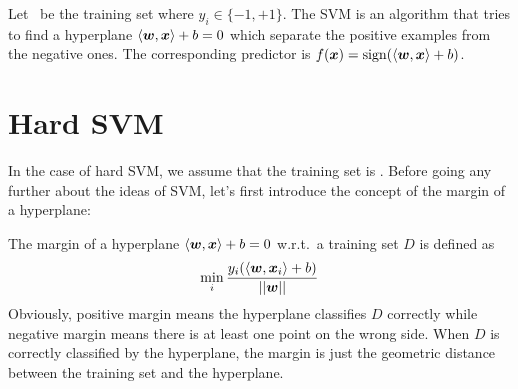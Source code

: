 Let \dataset\ be the training set where $y_i \in\{-1, +1\}$. The SVM is an algorithm that tries to find a 
hyperplane $\langle\boldsymbol{w}, \boldsymbol{x}\rangle + b = 0$ which separate the positive examples from the negative ones. The 
corresponding predictor is $f(\boldsymbol{x}) = \operatorname{sign}(\langle\boldsymbol{w}, \boldsymbol{x}\rangle + b)$.

\section{Hard SVM}
In the case of hard SVM, we assume that the training set is . Before going any 
further about the ideas of SVM, let's first introduce the concept of the margin of a hyperplane:
\begin{df}[Margin]
    The margin of a hyperplane $\langle\boldsymbol{w}, \boldsymbol{x}\rangle + b = 0$ w.r.t.\ a training set  $D$ is defined as
    \begin{equation*}
    \min_i \frac{y_i(\langle\boldsymbol{w}, \boldsymbol{x}_i\rangle + b)}{||\boldsymbol{w}||}
    \end{equation*}
    Obviously, positive margin means the hyperplane classifies $D$ correctly while negative margin means
    there is at least one point on the wrong side.
    When $D$ is correctly classified by the hyperplane, the margin is just the geometric distance between the
    training set and the hyperplane.
\end{df}

